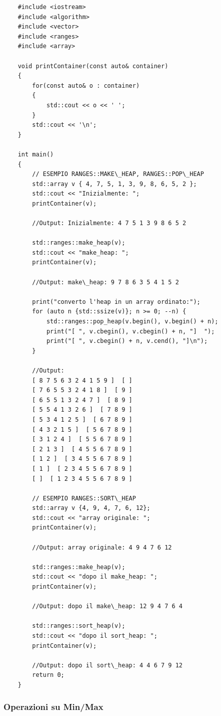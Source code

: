 \begin{lstlisting}
	#include <iostream>
	#include <algorithm>
	#include <vector>
	#include <ranges>
	#include <array>
	
	void printContainer(const auto& container)
	{
		for(const auto& o : container)
		{
			std::cout << o << ' ';
		}
		std::cout << '\n';
	}
	
	int main()
	{
		// ESEMPIO RANGES::MAKE\_HEAP, RANGES::POP\_HEAP
		std::array v { 4, 7, 5, 1, 3, 9, 8, 6, 5, 2 };
		std::cout << "Inizialmente: ";
		printContainer(v);
		
		//Output: Inizialmente: 4 7 5 1 3 9 8 6 5 2
		
		std::ranges::make_heap(v);
		std::cout << "make_heap: ";
		printContainer(v);
		
		//Output: make\_heap: 9 7 8 6 3 5 4 1 5 2
		
		print("converto l'heap in un array ordinato:");
		for (auto n {std::ssize(v)}; n >= 0; --n) {
			std::ranges::pop_heap(v.begin(), v.begin() + n);
			print("[ ", v.cbegin(), v.cbegin() + n, "]  ");
			print("[ ", v.cbegin() + n, v.cend(), "]\n");
		}
		
		//Output:
		[ 8 7 5 6 3 2 4 1 5 9 ]  [ ]
		[ 7 6 5 5 3 2 4 1 8 ]  [ 9 ]
		[ 6 5 5 1 3 2 4 7 ]  [ 8 9 ]
		[ 5 5 4 1 3 2 6 ]  [ 7 8 9 ]
		[ 5 3 4 1 2 5 ]  [ 6 7 8 9 ]
		[ 4 3 2 1 5 ]  [ 5 6 7 8 9 ]
		[ 3 1 2 4 ]  [ 5 5 6 7 8 9 ]
		[ 2 1 3 ]  [ 4 5 5 6 7 8 9 ]
		[ 1 2 ]  [ 3 4 5 5 6 7 8 9 ]
		[ 1 ]  [ 2 3 4 5 5 6 7 8 9 ]
		[ ]  [ 1 2 3 4 5 5 6 7 8 9 ]
		
		// ESEMPIO RANGES::SORT\_HEAP
		std::array v {4, 9, 4, 7, 6, 12};
		std::cout << "array originale: ";
		printContainer(v);
		
		//Output: array originale: 4 9 4 7 6 12
		
		std::ranges::make_heap(v);
		std::cout << "dopo il make_heap: ";
		printContainer(v);
		
		//Output: dopo il make\_heap: 12 9 4 7 6 4 
		
		std::ranges::sort_heap(v);
		std::cout << "dopo il sort_heap: ";
		printContainer(v);
		
		//Output: dopo il sort\_heap: 4 4 6 7 9 12
		return 0;
	}
\end{lstlisting}

\subsubsection{Operazioni su Min/Max}

\label{ranges_minmax}

